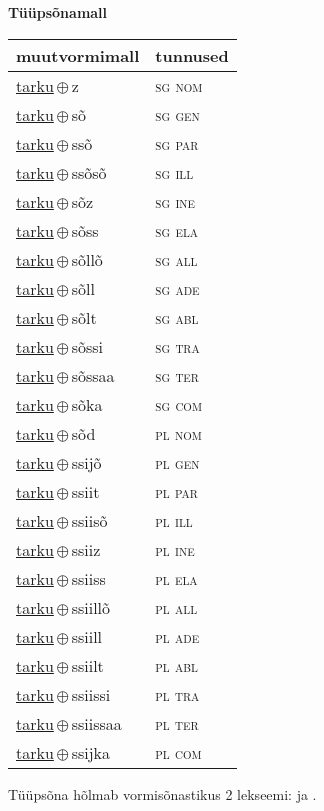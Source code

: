 

\vspace{3.5em}
\noindent \begin{minipage}{\textwidth}
\noindent \textbf{Tüüpsõnamall \,}\\

\begin{sideways}
\begin{tabular}{l l}
muutvormimall & tunnused \\
\hline
\underline{tarku}\,$\oplus$\,z & \textsc{ sg nom } \\
\underline{tarku}\,$\oplus$\,sõ & \textsc{ sg gen } \\
\underline{tarku}\,$\oplus$\,ssõ & \textsc{ sg par } \\
\underline{tarku}\,$\oplus$\,ssõsõ & \textsc{ sg ill } \\
\underline{tarku}\,$\oplus$\,sõz & \textsc{ sg ine } \\
\underline{tarku}\,$\oplus$\,sõss & \textsc{ sg ela } \\
\underline{tarku}\,$\oplus$\,sõllõ & \textsc{ sg all } \\
\underline{tarku}\,$\oplus$\,sõll & \textsc{ sg ade } \\
\underline{tarku}\,$\oplus$\,sõlt & \textsc{ sg abl } \\
\underline{tarku}\,$\oplus$\,sõssi & \textsc{ sg tra } \\
\underline{tarku}\,$\oplus$\,sõssaa & \textsc{ sg ter } \\
\underline{tarku}\,$\oplus$\,sõka & \textsc{ sg com } \\
\underline{tarku}\,$\oplus$\,sõd & \textsc{ pl nom } \\
\underline{tarku}\,$\oplus$\,ssijõ & \textsc{ pl gen } \\
\underline{tarku}\,$\oplus$\,ssiit & \textsc{ pl par } \\
\underline{tarku}\,$\oplus$\,ssiisõ & \textsc{ pl ill } \\
\underline{tarku}\,$\oplus$\,ssiiz & \textsc{ pl ine } \\
\underline{tarku}\,$\oplus$\,ssiiss & \textsc{ pl ela } \\
\underline{tarku}\,$\oplus$\,ssiillõ & \textsc{ pl all } \\
\underline{tarku}\,$\oplus$\,ssiill & \textsc{ pl ade } \\
\underline{tarku}\,$\oplus$\,ssiilt & \textsc{ pl abl } \\
\underline{tarku}\,$\oplus$\,ssiissi & \textsc{ pl tra } \\
\underline{tarku}\,$\oplus$\,ssiissaa & \textsc{ pl ter } \\
\underline{tarku}\,$\oplus$\,ssijka & \textsc{ pl com } \\
\end{tabular}
\end{sideways}
\label{tab:tüüpsõnamall-tarkuz}

\end{minipage}

 
\vspace{1em}
\noindent Tüüpsõna hõlmab vormisõnastikus 2 lekseemi:  ja .
